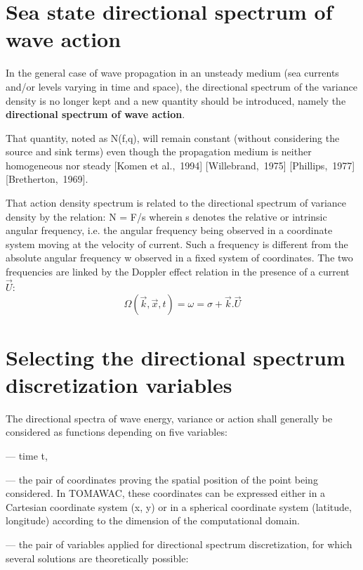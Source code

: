 \section{ Sea state directional spectrum of wave action}

 In the general case of wave propagation in an unsteady medium (sea currents and/or levels varying in time and space), the directional spectrum of the variance density is no longer kept and a new quantity should be introduced, namely the \textbf{directional spectrum of wave action}.

 That quantity, noted as N(f,q), will remain constant (without considering the source and sink terms) even though the propagation medium is neither homogeneous nor steady [Komen et al.,~1994] [Willebrand,~1975] [Phillips,~1977] [Bretherton,~1969].

 That action density spectrum is related to the directional spectrum of variance density by the relation:
\bequ
 \label{GrindEQ__2_15_}
N = F/s
\eequ
 wherein s denotes the relative or intrinsic angular frequency, i.e. the angular frequency being observed in a coordinate system moving at the velocity of current. Such a frequency is different from the absolute angular frequency w observed in a fixed system of coordinates. The two frequencies are linked by the Doppler effect relation in the presence of a current $\vec{U}$:
\begin{equation} \label{GrindEQ__2_16_}
\Omega (\vec{k},\vec{x},t)=\omega =\sigma +\vec{k}.\vec{U}
\end{equation}


\section{ Selecting the directional spectrum discretization variables}

 The directional spectra of wave energy, variance or action shall generally be considered as functions depending on five variables:

 --- time t,

 --- the pair of coordinates proving the spatial position of the point being considered. In TOMAWAC, these coordinates can be expressed either in a Cartesian coordinate system (x, y) or in a spherical coordinate system (latitude, longitude) according to the dimension of the computational domain.

 --- the pair of variables applied for directional spectrum discretization, for which several solutions are theoretically possible:


